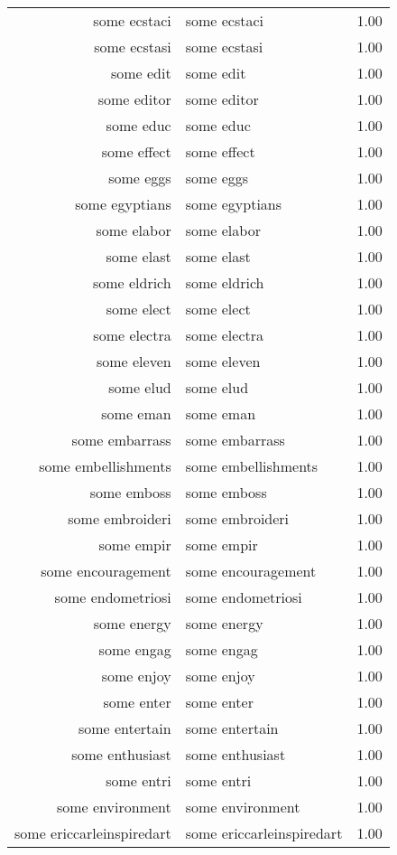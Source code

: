 \begin{table}[ht]
\begin{tabular}{rlr}
  some ecstaci & some ecstaci & 1.00 \\ 
  some ecstasi & some ecstasi & 1.00 \\ 
  some edit & some edit & 1.00 \\ 
  some editor & some editor & 1.00 \\ 
  some educ & some educ & 1.00 \\ 
  some effect & some effect & 1.00 \\ 
  some eggs & some eggs & 1.00 \\ 
  some egyptians & some egyptians & 1.00 \\ 
  some elabor & some elabor & 1.00 \\ 
  some elast & some elast & 1.00 \\ 
  some eldrich & some eldrich & 1.00 \\ 
  some elect & some elect & 1.00 \\ 
  some electra & some electra & 1.00 \\ 
  some eleven & some eleven & 1.00 \\ 
  some elud & some elud & 1.00 \\ 
  some eman & some eman & 1.00 \\ 
  some embarrass & some embarrass & 1.00 \\ 
  some embellishments & some embellishments & 1.00 \\ 
  some emboss & some emboss & 1.00 \\ 
  some embroideri & some embroideri & 1.00 \\ 
  some empir & some empir & 1.00 \\ 
  some encouragement & some encouragement & 1.00 \\ 
  some endometriosi & some endometriosi & 1.00 \\ 
  some energy & some energy & 1.00 \\ 
  some engag & some engag & 1.00 \\ 
  some enjoy & some enjoy & 1.00 \\ 
  some enter & some enter & 1.00 \\ 
  some entertain & some entertain & 1.00 \\ 
  some enthusiast & some enthusiast & 1.00 \\ 
  some entri & some entri & 1.00 \\ 
  some environment & some environment & 1.00 \\ 
  some ericcarleinspiredart & some ericcarleinspiredart & 1.00 \\ 

\end{tabular}
\end{table}
